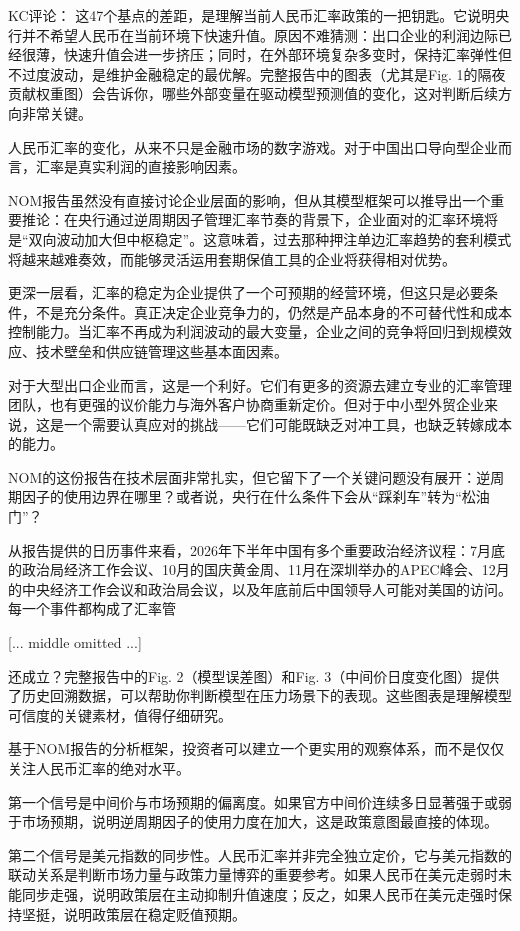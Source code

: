 \documentclass[11pt]{ctexart}
\begin{document}
KC评论： 这47个基点的差距，是理解当前人民币汇率政策的一把钥匙。它说明央行并不希望人民币在当前环境下快速升值。原因不难猜测：出口企业的利润边际已经很薄，快速升值会进一步挤压；同时，在外部环境复杂多变时，保持汇率弹性但不过度波动，是维护金融稳定的最优解。完整报告中的图表（尤其是Fig. 1的隔夜贡献权重图）会告诉你，哪些外部变量在驱动模型预测值的变化，这对判断后续方向非常关键。

人民币汇率的变化，从来不只是金融市场的数字游戏。对于中国出口导向型企业而言，汇率是真实利润的直接影响因素。

NOM报告虽然没有直接讨论企业层面的影响，但从其模型框架可以推导出一个重要推论：在央行通过逆周期因子管理汇率节奏的背景下，企业面对的汇率环境将是“双向波动加大但中枢稳定”。这意味着，过去那种押注单边汇率趋势的套利模式将越来越难奏效，而能够灵活运用套期保值工具的企业将获得相对优势。

更深一层看，汇率的稳定为企业提供了一个可预期的经营环境，但这只是必要条件，不是充分条件。真正决定企业竞争力的，仍然是产品本身的不可替代性和成本控制能力。当汇率不再成为利润波动的最大变量，企业之间的竞争将回归到规模效应、技术壁垒和供应链管理这些基本面因素。

对于大型出口企业而言，这是一个利好。它们有更多的资源去建立专业的汇率管理团队，也有更强的议价能力与海外客户协商重新定价。但对于中小型外贸企业来说，这是一个需要认真应对的挑战——它们可能既缺乏对冲工具，也缺乏转嫁成本的能力。

NOM的这份报告在技术层面非常扎实，但它留下了一个关键问题没有展开：逆周期因子的使用边界在哪里？或者说，央行在什么条件下会从“踩刹车”转为“松油门”？

从报告提供的日历事件来看，2026年下半年中国有多个重要政治经济议程：7月底的政治局经济工作会议、10月的国庆黄金周、11月在深圳举办的APEC峰会、12月的中央经济工作会议和政治局会议，以及年底前后中国领导人可能对美国的访问。每一个事件都构成了汇率管

[... middle omitted ...]

还成立？完整报告中的Fig. 2（模型误差图）和Fig. 3（中间价日度变化图）提供了历史回溯数据，可以帮助你判断模型在压力场景下的表现。这些图表是理解模型可信度的关键素材，值得仔细研究。

基于NOM报告的分析框架，投资者可以建立一个更实用的观察体系，而不是仅仅关注人民币汇率的绝对水平。

第一个信号是中间价与市场预期的偏离度。如果官方中间价连续多日显著强于或弱于市场预期，说明逆周期因子的使用力度在加大，这是政策意图最直接的体现。

第二个信号是美元指数的同步性。人民币汇率并非完全独立定价，它与美元指数的联动关系是判断市场力量与政策力量博弈的重要参考。如果人民币在美元走弱时未能同步走强，说明政策层在主动抑制升值速度；反之，如果人民币在美元走强时保持坚挺，说明政策层在稳定贬值预期。
\end{document}
